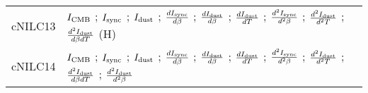\begin{tabular}{cl}
 cNILC13 &  $I_{\rm CMB}$ ; $I_{\rm sync}$ ; $I_{\rm dust}$ ; $\frac{d I_{\rm sync}}{d \beta}$ ; $\frac{d I_{\rm dust}}{d \beta}$ ; $\frac{d I_{\rm dust}}{d T}$ ; $\frac{d^2 I_{\rm sync}}{d^2 \beta}$ ; $\frac{d^2 I_{\rm dust}}{d^2 T}$ ; $\frac{d^2 I_{\rm dust}}{d \beta d T}$ (H) \\
 cNILC14 &  $I_{\rm CMB}$ ; $I_{\rm sync}$ ; $I_{\rm dust}$ ; $\frac{d I_{\rm sync}}{d \beta}$ ; $\frac{d I_{\rm dust}}{d \beta}$ ; $\frac{d I_{\rm dust}}{d T}$ ; $\frac{d^2 I_{\rm sync}}{d^2 \beta}$ ; $\frac{d^2 I_{\rm dust}}{d^2 T}$ ; $\frac{d^2 I_{\rm dust}}{d \beta d T}$ ; $\frac{d^2 I_{\rm dust}}{d^2 \beta}$ \\
\bottomrule
\end{tabular}
